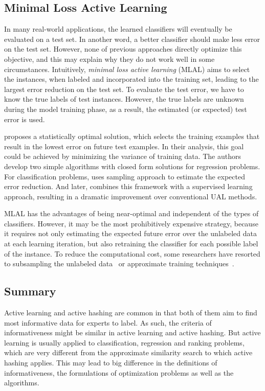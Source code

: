 \subsection{Minimal Loss Active Learning}


In many real-world applications, the learned classifiers will eventually be evaluated on a test set. In another word, a better classifier should make less error on the test set. However, none of previous approaches directly optimize this objective, and this may explain why they do not work well in some circumstances. Intuitively, \textit{minimal loss active learning} (\mbox{MLAL}) aims to select the instances, when labeled and incorporated into the training set, leading to the largest error reduction on the test set. To evaluate the test error, we have to know the true labels of test instances. However, the true labels are unknown during the model training phase, as a result, the estimated (or expected) test error is used.

\cite{cohn1996jair} proposes a statistically optimal solution, which selects the training examples that result in the lowest error on future test examples. In their analysis, this goal could be achieved by minimizing the variance of training data. The authors develop two simple algorithms with closed form solutions for regression problems. For classification problems, \cite{Roy2001icml} uses sampling approach to estimate the expected error reduction. And later, \cite{Zhu2003icmlws} combines this framework with a supervised learning approach, resulting in a dramatic improvement over conventional \mbox{UAL} methods.

\mbox{MLAL} has the advantages of being near-optimal and independent of the types of classifiers. However, it may be the most prohibitively expensive strategy, because it requires not only estimating the expected future error over the unlabeled data at each learning iteration, but also retraining the classifier for each possible label of the instance. To reduce the computational cost, some researchers have resorted to subsampling the unlabeled data~\cite{Roy2001icml} or approximate training techniques~\cite{Guo07ijcai}.

\subsection{Summary}
Active learning and active hashing are common in that both of them aim to find most informative data for experts to label. As such, the criteria of informativeness might be similar in active learning and active hashing. But active learning is usually applied to classification, regression and ranking problems, which are very different from the approximate similarity search to which active hashing applies. This may lead to big difference in the definitions of informativeness, the formulations of optimization problems as well as the algorithms.

